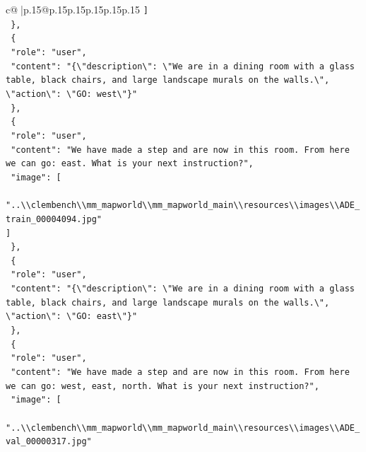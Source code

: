 \documentclass{article}
\begin{document}
{\begin{supertabular}{c@{$\;$}|p{.15\linewidth}@{}p{.15\linewidth}p{.15\linewidth}p{.15\linewidth}p{.15\linewidth}p{.15\linewidth}}
{{{\texttt{    {]}} \\
\texttt{  \},} \\
\texttt{  \{} \\
\texttt{    "role": "user",} \\
\texttt{    "content": "\{\textbackslash{}"description\textbackslash{}": \textbackslash{}"We are in a dining room with a glass table, black chairs, and large landscape murals on the walls.\textbackslash{}", \textbackslash{}"action\textbackslash{}": \textbackslash{}"GO: west\textbackslash{}"\}"} \\
\texttt{  \},} \\
\texttt{  \{} \\
\texttt{    "role": "user",} \\
\texttt{    "content": "We have made a step and are now in this room. From here we can go: east. What is your next instruction?",} \\
\texttt{    "image": {[}} \\
\texttt{      "..\textbackslash{}\textbackslash{}clembench\textbackslash{}\textbackslash{}mm\_mapworld\textbackslash{}\textbackslash{}mm\_mapworld\_main\textbackslash{}\textbackslash{}resources\textbackslash{}\textbackslash{}images\textbackslash{}\textbackslash{}ADE\_train\_00004094.jpg"} \\
\texttt{    {]}} \\
\texttt{  \},} \\
\texttt{  \{} \\
\texttt{    "role": "user",} \\
\texttt{    "content": "\{\textbackslash{}"description\textbackslash{}": \textbackslash{}"We are in a dining room with a glass table, black chairs, and large landscape murals on the walls.\textbackslash{}", \textbackslash{}"action\textbackslash{}": \textbackslash{}"GO: east\textbackslash{}"\}"} \\
\texttt{  \},} \\
\texttt{  \{} \\
\texttt{    "role": "user",} \\
\texttt{    "content": "We have made a step and are now in this room. From here we can go: west, east, north. What is your next instruction?",} \\
\texttt{    "image": {[}} \\
\texttt{      "..\textbackslash{}\textbackslash{}clembench\textbackslash{}\textbackslash{}mm\_mapworld\textbackslash{}\textbackslash{}mm\_mapworld\_main\textbackslash{}\textbackslash{}resources\textbackslash{}\textbackslash{}images\textbackslash{}\textbackslash{}ADE\_val\_00000317.jpg"} \\
}}}
\end{supertabular}}
\end{document}
